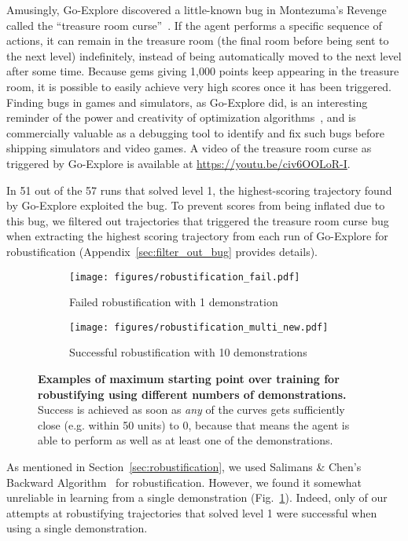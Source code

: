 \documentclass{article}
\begin{document}
Amusingly, Go-Explore discovered a little-known bug in Montezuma's Revenge called the ``treasure room curse''~\cite{atari_bugs}. If the agent performs a specific sequence of actions, it can remain in the treasure room (the final room before being sent to the next level) indefinitely, instead of being automatically moved to the next level after some time. Because gems giving 1,000 points keep appearing in the treasure room, it is possible to easily achieve very high scores once it has been triggered. Finding bugs in games and simulators, as Go-Explore did, is an interesting reminder of the power and creativity of optimization algorithms~\cite{Lehman2018TheSC}, and is commercially valuable as a debugging tool to identify and fix such bugs before shipping simulators and video games. A video of the treasure room curse  as triggered by Go-Explore is available at \url{https://youtu.be/civ6OOLoR-I}.

In 51 out of the 57 runs that solved level 1, the highest-scoring trajectory found by Go-Explore exploited the bug. To prevent scores from being inflated due to this bug, we filtered out trajectories that triggered the treasure room curse bug when extracting the highest scoring trajectory from each run of Go-Explore for robustification (Appendix~\ref{sec:filter_out_bug} provides details).

\begin{figure}
    \begin{subfigure}[t]{.495\textwidth}
        \centering
        \texttt{[image: figures/robustification\_fail.pdf]}
        \caption{Failed robustification with 1 demonstration}
        \label{fig:robust_fail}
    \end{subfigure}
    \begin{subfigure}[t]{.495\textwidth}
        \centering
        \texttt{[image: figures/robustification\_multi\_new.pdf]}
        \caption{Successful robustification with 10 demonstrations}
        \label{fig:robust_multi}
    \end{subfigure}
    \caption{\textbf{Examples of maximum starting point over training for robustifying using different numbers of demonstrations.} Success is achieved as soon as \emph{any} of the curves gets sufficiently close (e.g. within 50 units) to 0, because that means the agent is able to perform as well as at least one of the demonstrations.}
    \label{fig:robust_overall}
\end{figure}

As mentioned in Section~\ref{sec:robustification}, we used Salimans \& Chen’s Backward Algorithm~\cite{salimans2018learning} for robustification. However, we found it somewhat unreliable in learning from a single demonstration (Fig.~\ref{fig:robust_fail}). Indeed, only  of our attempts at robustifying trajectories that solved level 1 were successful when using a single demonstration.
\end{document}

